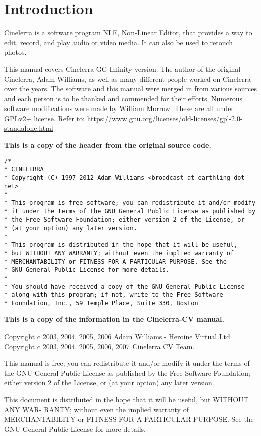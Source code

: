 \chapter*{Introduction}%
\label{cha:introduction}

Cinelerra is a software program NLE, Non-Linear Editor, that provides a way to edit, record, and play audio or video media. 
It can also be used to retouch photos.

This manual covers Cinelerra-GG Infinity version. 
The author of the original Cinelerra, Adam Williams, as well as many different people worked on Cinelerra over the years. 
The software and this manual were merged in from various sources and each person is to be thanked and commended for their efforts. 
Numerous software modifications were made by William Morrow. 
These are all under GPLv2+ license. 
Refer to: \url{https://www.gnu.org/licenses/old-licenses/gpl-2.0-standalone.html}


\textbf{This is a copy of the header from the original source code.}
\begin{lstlisting}[numbers=none]
/*
* CINELERRA
* Copyright (C) 1997-2012 Adam Williams <broadcast at earthling dot net>
*
* This program is free software; you can redistribute it and/or modify
* it under the terms of the GNU General Public License as published by
* the Free Software Foundation; either version 2 of the License, or
* (at your option) any later version.
*
* This program is distributed in the hope that it will be useful,
* but WITHOUT ANY WARRANTY; without even the implied warranty of
* MERCHANTABILITY or FITNESS FOR A PARTICULAR PURPOSE. See the
* GNU General Public License for more details.
*
* You should have received a copy of the GNU General Public License
* along with this program; if not, write to the Free Software
* Foundation, Inc., 59 Temple Place, Suite 330, Boston
\end{lstlisting}

\textbf{This is a copy of the information in the Cinelerra-CV manual.}

Copyright c 2003, 2004, 2005, 2006 Adam Williams - Heroine Virtual Ltd.
Copyright c 2003, 2004, 2005, 2006, 2007 Cinelerra CV Team.

This manual is free; you can redistribute it and/or modify it under the terms of the GNU General
Public License as published by the Free Software Foundation; either version 2 of the License, or
(at your option) any later version.

This document is distributed in the hope that it will be useful, but WITHOUT ANY WAR-
RANTY; without even the implied warranty of MERCHANTABILITY or FITNESS FOR A
PARTICULAR PURPOSE. See the GNU General Public License for more details.

